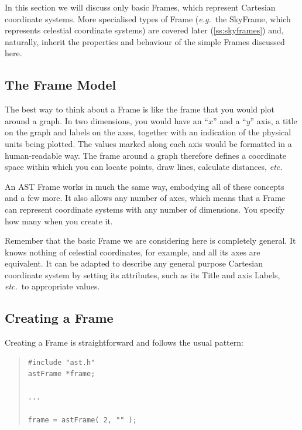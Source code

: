 \documentclass[twoside,11pt]{article}
\newcommand{\htmlref}[2]{#1}
\newcommand{\secref}[1]{\S\ref{#1}}
\renewcommand{\secref}[1]{\ref{#1}}
\begin{document}
In this section we will discuss only basic Frames, which represent
Cartesian coordinate systems. More specialised types of Frame
({\em{e.g.}}\ the \htmlref{SkyFrame}{SkyFrame}, which represents celestial coordinate
systems) are covered later (\secref{ss:skyframes}) and, naturally,
inherit the properties and behaviour of the simple Frames discussed
here.

\subsection{The Frame Model}

The best way to think about a \htmlref{Frame}{Frame} is like the frame that you would
plot around a graph. In two dimensions, you would have an ``$x$'' and
a ``$y$'' axis, a title on the graph and labels on the axes, together
with an indication of the physical units being plotted. The values
marked along each axis would be formatted in a human-readable way. The
frame around a graph therefore defines a coordinate space within which
you can locate points, draw lines, calculate distances, {\em{etc.}}

An AST Frame works in much the same way, embodying all of these
concepts and a few more. It also allows any number of axes, which
means that a Frame can represent coordinate systems with any number of
dimensions. You specify how many when you create it.

Remember that the basic Frame we are considering here is completely
general.  It knows nothing of celestial coordinates, for example, and
all its axes are equivalent. It can be adapted to describe any general
purpose Cartesian coordinate system by setting its attributes, such as
its \htmlref{Title}{Title} and axis Labels, {\em{etc.}}\ to appropriate values.

\subsection{\label{ss:creatingframes}Creating a Frame}

Creating a \htmlref{Frame}{Frame} is straightforward and follows the usual pattern:

\begin{quote}
\small
\begin{verbatim}
#include "ast.h"
astFrame *frame;

...

frame = astFrame( 2, "" );
\end{verbatim}
\normalsize
\end{quote}
\end{document}
